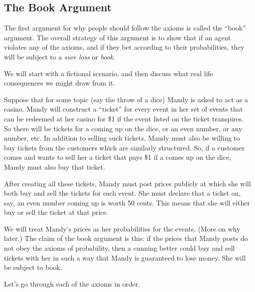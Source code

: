 \subsection{The Book Argument}

The first argument for why people should follow the axioms is called the ``book'' argument.  The overall strategy of this argument is to show that if an agent violates any of the axioms, and if they bet according to their probabilities, they will be subject to a {\it sure loss} or {\it book}.

We will start with a fictional scenario, and then discuss what real life consequences we might draw from it.  

Suppose that for some topic (say the throw of a dice) Mandy is asked to act as a casino. Mandy will construct a ``ticket'' for every event in her set of events that can be redeemed at her casino for \$1 if the event listed on the ticket transpires.  So there will be tickets for a  coming up on the dice, or an even number, or any number, etc. In addition to selling such tickets, Mandy must also be willing to buy tickets from the customers which are similarly structured.  So, if a customer comes and wants to sell her a ticket that pays \$1 if a  comes up on the dice, Mandy must also buy that ticket.

After creating all these tickets, Mandy must post prices publicly at which she will both buy and sell the tickets for each event.  She must declare that a ticket on, say, an even number coming up is worth 50 cents. This means that she will either buy or sell the ticket at that price.

We will treat Mandy's prices as her probabilities for the events. (More on why later.) The claim of the book argument is this: if the prices that Mandy posts do not obey the axioms of probability, then a cunning better could buy and sell tickets with her in such a way that Mandy is guaranteed to lose money. She will be subject to book.

Let's go through each of the axioms in order.

